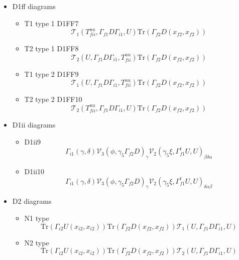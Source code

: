 \documentclass{article}[12pt]
\begin{document}
\begin{itemize}
\begin{itemize}
$$$$
$$
{\mathcal V}_5(i2,f2)_{\beta\gamma}{\mathcal V}_6(i2,f2)_{\alpha\delta}(phiui2,phidf2U)
$$
\end{itemize}
\item D1ff diagrams
\begin{itemize}
\item T1 type 1 D1FF7
$$
{\mathcal T}_1\left(T^{uu}_{fii},\Gamma_{f1}D\Gamma_{i1},U\right)\mathrm{Tr}\left(\Gamma_{f2}D\left(x_{f2},x_{f2}\right)\right)
$$
\item T2 type 1 D1FF8
$$
{\mathcal T}_2\left(U,\Gamma_{f1}D\Gamma_{i1},T^{uu}_{fii}\right)\mathrm{Tr}\left(\Gamma_{f2}D\left(x_{f2},x_{f2}\right)\right)
$$
\item T1 type 2 D1FF9
$$
{\mathcal T}_1\left(U,\Gamma_{f1}D\Gamma_{i1},T^{uu}_{fii}\right)\mathrm{Tr}\left(\Gamma_{f2}D\left(x_{f2},x_{f2}\right)\right)
$$
\item T2 type 2 D1FF10
$$
{\mathcal T}_2\left(T^{uu}_{fii},\Gamma_{f1}D\Gamma_{i1},U\right)\mathrm{Tr}\left(\Gamma_{f2}D\left(x_{f2},x_{f2}\right)\right)
$$
\end{itemize}
\item D1ii diagrams
\begin{itemize}
\item D1ii9
$$
\Gamma_{i1}\left(\gamma,\delta\right){\mathcal V}_3\left(\phi,\gamma_5\Gamma_{f2}D\right)_\gamma
{\mathcal V}_2\left(\gamma_5\xi,\Gamma_{f1}^tU,U\right)_{\beta\delta\alpha}
$$
\item D1ii10
$$
\Gamma_{i1}\left(\gamma,\delta\right){\mathcal V}_3\left(\phi,\gamma_5\Gamma_{f2}D\right)_\gamma
{\mathcal V}_2\left(\gamma_5\xi,\Gamma_{f1}^tU,U\right)_{\delta\alpha\beta}
$$
\end{itemize}
\item D2 diagrams
\begin{itemize}
\item N1 type
$$
\mathrm{Tr}\left(\Gamma_{i2}U\left(x_{i2},x_{i2}\right)\right)\mathrm{Tr}\left(\Gamma_{f2}D\left(x_{f2},x_{f2}\right)\right){\mathcal T}_1\left(U,\Gamma_{f1}D\Gamma_{i1},U\right)
$$
\item N2 type
$$
\mathrm{Tr}\left(\Gamma_{i2}U\left(x_{i2},x_{i2}\right)\right)\mathrm{Tr}\left(\Gamma_{f2}D\left(x_{f2},x_{f2}\right)\right){\mathcal T}_2\left(U,\Gamma_{f1}D\Gamma_{i1},U\right)
$$
\end{itemize}
\end{itemize}
\end{document}
